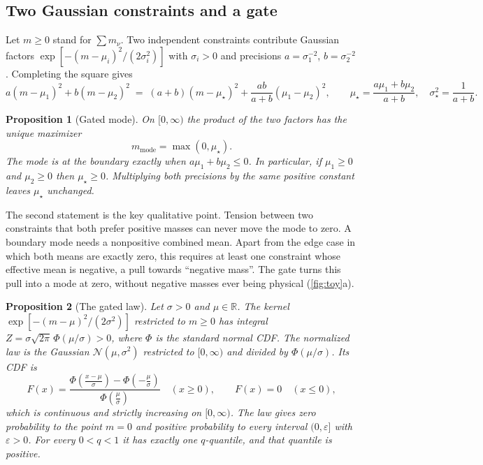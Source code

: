 \documentclass[11pt]{article}
\newtheorem{proposition}{Proposition}
\theoremstyle{remark}
\newcommand{\mnu}{\sum m_\nu}
\numberwithin{equation}{section}
\begin{document}
\subsection{Two Gaussian constraints and a gate}
Let $m\ge0$ stand for $\mnu$. Two independent constraints contribute Gaussian factors $\exp[-(m-\mu_i)^2/(2\sigma_i^2)]$ with $\sigma_i>0$ and precisions $a=\sigma_1^{-2}$, $b=\sigma_2^{-2}$. Completing the square gives
\begin{equation}
  a(m-\mu_1)^2+b(m-\mu_2)^2 \;=\; (a+b)(m-\mu_\star)^2+\frac{ab}{a+b}(\mu_1-\mu_2)^2,
  \qquad
  \mu_\star=\frac{a\mu_1+b\mu_2}{a+b},\quad \sigma_\star^2=\frac{1}{a+b}.
  \label{eq:toy_combined_gaussian}
\end{equation}

\begin{proposition}[Gated mode]\label{prop:mode}
On $[0,\infty)$ the product of the two factors has the unique maximizer
\begin{equation}
  m_{\mathrm{mode}}=\max(0,\mu_\star).
  \label{eq:toy_trunc_mode}
\end{equation}
The mode is at the boundary exactly when $a\mu_1+b\mu_2\le0$. In particular, if $\mu_1\ge0$ and $\mu_2\ge0$ then $\mu_\star\ge0$. Multiplying both precisions by the same positive constant leaves $\mu_\star$ unchanged.
\end{proposition}

The second statement is the key qualitative point. Tension between two constraints that both prefer positive masses can never move the mode to zero. A boundary mode needs a nonpositive combined mean. Apart from the edge case in which both means are exactly zero, this requires at least one constraint whose effective mean is negative, a pull towards ``negative mass''. The gate turns this pull into a mode at zero, without negative masses ever being physical (\cref{fig:toy}a).

\begin{proposition}[The gated law]\label{prop:law}
Let $\sigma>0$ and $\mu\in\mathbb{R}$. The kernel $\exp[-(m-\mu)^2/(2\sigma^2)]$ restricted to $m\ge0$ has integral $Z=\sigma\sqrt{2\pi}\,\Phi(\mu/\sigma)>0$, where $\Phi$ is the standard normal CDF. The normalized law is the Gaussian $\mathcal N(\mu,\sigma^2)$ restricted to $[0,\infty)$ and divided by $\Phi(\mu/\sigma)$. Its CDF is
\begin{equation}
  F(x)=\frac{\Phi\!\left(\frac{x-\mu}{\sigma}\right)-\Phi\!\left(-\frac{\mu}{\sigma}\right)}{\Phi\!\left(\frac{\mu}{\sigma}\right)}\quad(x\ge0),\qquad F(x)=0\quad(x\le0),
  \label{eq:gated_cdf}
\end{equation}
which is continuous and strictly increasing on $[0,\infty)$. The law gives zero probability to the point $m=0$ and positive probability to every interval $(0,\varepsilon]$ with $\varepsilon>0$. For every $0<q<1$ it has exactly one $q$-quantile, and that quantile is positive.
\end{proposition}
\end{document}
